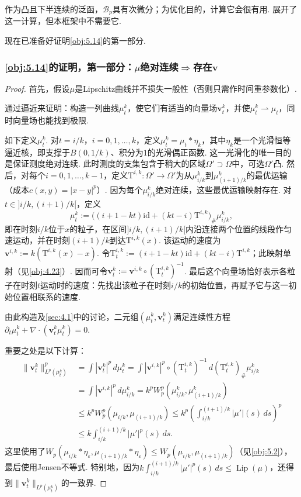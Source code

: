 \begin{remark}\label{obj:5.19}
作为凸且下半连续的泛函，$\mathscr B_p$具有次微分；为优化目的，计算它会很有用. \cite{b235}展开了这一计算，但本框架中不需要它.
\end{remark}

现在已准备好证明\autoref{obj:5.14}的第一部分.

\subsubsection[主要定理的证明，第一部分：构造速度场]{\autoref{obj:5.14}的证明，第一部分：$\mu$绝对连续$\Rightarrow$存在$\mathbf v$}\label{sec:5.3.2}

\begin{proof}
首先，假设$\mu$是Lipschitz曲线并不损失一般性（否则只需作时间重参数化）.

通过逼近来证明：构造一列曲线$\mu_t^k$，使它们有适当的向量场$\mathbf v_t^k$，并使$\mu_t^k\rightharpoonup\mu_t$，同时向量场也能找到极限.

如下定义$\mu_t^k$. 对$t=i/k$，$i=0,1,\ldots,k$，定义$\mu_t^k=\mu_t*\eta_k$，其中$\eta_k$是一个光滑恒等逼近核，即支撑于$B(0,1/k)$、积分为$1$的光滑偶正函数. 这一光滑化的唯一目的是保证测度绝对连续. 此时测度的支集包含于稍大的区域$\Omega'\supset\Omega$中，可选$\Omega'$凸. 然后，对每个$i=0,1,\ldots,k-1$，定义$\mathrm T^{i,k}:\Omega'\to\Omega'$为从$\mu_{i/k}^k$到$\mu_{(i+1)/k}^k$的最优运输（成本$c(x,y)=|x-y|^p$）. 因为每个$\mu_{i/k}^k$绝对连续，这些最优运输映射存在. 对$t\in]i/k,(i+1)/k[$，定义
\[
\mu_t^k:=\bigl((i+1-kt)\mathrm{id}+(kt-i)\mathrm T^{i,k}\bigr)_\#\mu_{i/k}^k,
\]
即在时刻$i/k$位于$x$的粒子，在区间$]i/k,(i+1)/k[$内沿连接两个位置的线段作匀速运动，并在时刻$(i+1)/k$到达$\mathrm T^{i,k}(x)$. 该运动的速度为$\mathbf v^{i,k}:=k(\mathrm T^{i,k}(x)-x)$. 令$\mathrm T_t^{i,k}:=(i+1-kt)\mathrm{id}+(kt-i)\mathrm T^{i,k}$；此映射单射（见\autoref{obj:4.23}）. 因而可令$\mathbf v_t^k:=\mathbf v^{i,k}\circ(\mathrm T_t^{i,k})^{-1}$. 最后这个向量场恰好表示各粒子在时刻$t$运动时的速度：先找出该粒子在时刻$i/k$的初始位置，再赋予它与这一初始位置相联系的速度.

由此构造及\autoref{sec:4.1}中的讨论，二元组$(\mu_t^k,\mathbf v_t^k)$满足连续性方程$\partial_t\mu_t^k+\nabla\cdot(\mathbf v_t^k\mu_t^k)=0$.

重要之处是以下计算：
\[
\begin{aligned}
\|\mathbf v_t^k\|_{L^p(\mu_t^k)}^p
&=\int|\mathbf v_t^k|^p\,d\mu_t^k
=\int|\mathbf v^{i,k}|^p\circ(\mathrm T_t^{i,k})^{-1}\,d(\mathrm T_t^{i,k})_\#\mu_{i/k}^k\\
&=\int|\mathbf v^{i,k}|^p\,d\mu_{i/k}^k
=k^pW_p^p(\mu_{i/k}^k,\mu_{(i+1)/k}^k)\\
&\le k^pW_p^p(\mu_{i/k},\mu_{(i+1)/k})
\le k^p\left(\int_{i/k}^{(i+1)/k}|\mu'|(s)\,ds\right)^p\\
&\le k\int_{i/k}^{(i+1)/k}|\mu'|^p(s)\,ds.
\end{aligned}
\]
这里使用了$W_p(\mu_{i/k}*\eta_\varepsilon,\mu_{(i+1)/k}*\eta_\varepsilon)\le W_p(\mu_{i/k},\mu_{(i+1)/k})$（见\autoref{obj:5.2}），最后使用Jensen不等式. 特别地，因为$k\int_{i/k}^{(i+1)/k}|\mu'|^p(s)\,ds\le\operatorname{Lip}(\mu)$，还得到$\|\mathbf v_t^k\|_{L^p(\mu_t^k)}$的一致界.


\end{proof}
